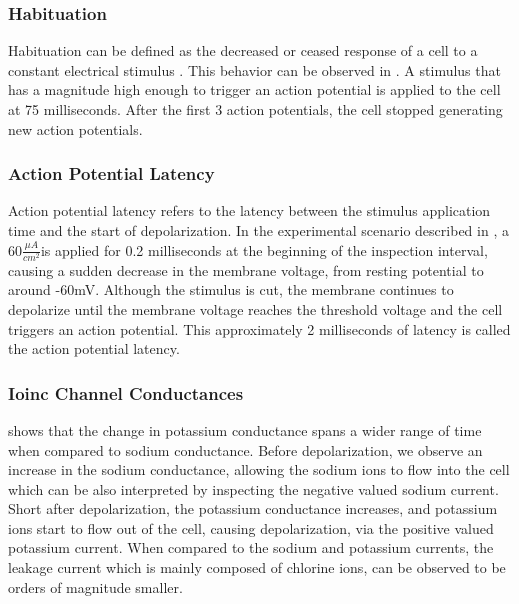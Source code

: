 \documentclass{IEEEtran}
\begin{document}
\subsubsection{Habituation}
Habituation can be defined as the decreased or ceased response of a cell to a constant electrical stimulus \cite{cheever1994habituation}. This behavior can be observed in . A stimulus that has a magnitude high enough to trigger an action potential is applied to the cell at 75 milliseconds. After the first 3 action potentials, the cell stopped generating new action potentials. 
\subsubsection{Action Potential Latency}
Action potential latency refers to the latency between the stimulus application time and the start of depolarization. In the experimental scenario described in , a 60$\frac{\mu A}{cm^2}$is applied for 0.2 milliseconds at the beginning of the inspection interval, causing a sudden decrease in the membrane voltage, from resting potential to around -60mV. Although the stimulus is cut, the membrane continues to depolarize until the membrane voltage reaches the threshold voltage and the cell triggers an action potential. This approximately 2 milliseconds of latency is called the action potential latency. 
\subsubsection{Ioinc Channel Conductances}
 shows that the change in potassium conductance spans a wider range of time when compared to sodium conductance. Before depolarization, we observe an increase in the sodium conductance, allowing the sodium ions to flow into the cell which can be also interpreted by inspecting the negative valued sodium current. Short after depolarization, the potassium conductance increases, and potassium ions start to flow out of the cell, causing depolarization, via the positive valued potassium current. When compared to the sodium and potassium currents, the leakage current which is mainly composed of chlorine ions, can be observed to be orders of magnitude smaller. 
\end{document}
